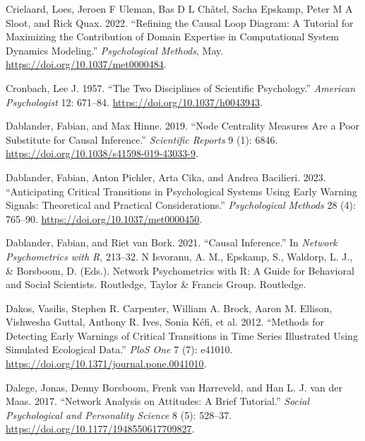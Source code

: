 \documentclass[
  a4paper,
  DIV=11,
  numbers=noendperiod,
  oneside]{scrreprt}
\newlength{\cslhangindent}
\newenvironment{CSLReferences}[2] %
 {\begin{list}{}{%
  \setlength{\itemindent}{0pt}
  \setlength{\leftmargin}{0pt}
  \setlength{\parsep}{0pt}
  \ifodd #1
   \setlength{\leftmargin}{\cslhangindent}
   \setlength{\itemindent}{-1\cslhangindent}
  \fi
  \setlength{\itemsep}{#2\baselineskip}}}
 {\end{list}}
\begin{document}
\begin{CSLReferences}{1}{0}
Crielaard, Loes, Jeroen F Uleman, Bas D L Châtel, Sacha Epskamp, Peter M
A Sloot, and Rick Quax. 2022. {``Refining the Causal Loop Diagram: {A}
Tutorial for Maximizing the Contribution of Domain Expertise in
Computational System Dynamics Modeling.''} \emph{Psychological Methods},
May. \url{https://doi.org/10.1037/met0000484}.

Cronbach, Lee J. 1957. {``The Two Disciplines of Scientific
Psychology.''} \emph{American Psychologist} 12: 671--84.
\url{https://doi.org/10.1037/h0043943}.

Dablander, Fabian, and Max Hinne. 2019. {``Node Centrality Measures Are
a Poor Substitute for Causal Inference.''} \emph{Scientific Reports} 9
(1): 6846. \url{https://doi.org/10.1038/s41598-019-43033-9}.

Dablander, Fabian, Anton Pichler, Arta Cika, and Andrea Bacilieri. 2023.
{``Anticipating Critical Transitions in Psychological Systems Using
Early Warning Signals: Theoretical and Practical Considerations.''}
\emph{Psychological Methods} 28 (4): 765--90.
\url{https://doi.org/10.1037/met0000450}.

Dablander, Fabian, and Riet van Bork. 2021. {``Causal Inference.''} In
\emph{Network {Psychometrics} with {R}}, 213--32. N {Isvoranu}, {A}.
{M}., {Epskamp}, {S}., {Waldorp}, {L}. {J}., \& {Borsboom}, {D}.
({Eds}.). {Network} Psychometrics with {R}: {A} Guide for Behavioral and
Social Scientists. {Routledge}, {Taylor} \& {Francis Group}.
{Routledge}.

Dakos, Vasilis, Stephen R. Carpenter, William A. Brock, Aaron M.
Ellison, Vishwesha Guttal, Anthony R. Ives, Sonia Kéfi, et al. 2012.
{``Methods for Detecting Early Warnings of Critical Transitions in Time
Series Illustrated Using Simulated Ecological Data.''} \emph{PloS One} 7
(7): e41010. \url{https://doi.org/10.1371/journal.pone.0041010}.

Dalege, Jonas, Denny Borsboom, Frenk van Harreveld, and Han L. J. van
der Maas. 2017. {``Network Analysis on Attitudes: A Brief Tutorial.''}
\emph{Social Psychological and Personality Science} 8 (5): 528--37.
\url{https://doi.org/10.1177/1948550617709827}.


\end{CSLReferences}
\end{document}

